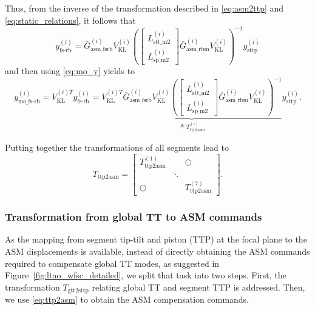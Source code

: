 \documentclass{gmto}
\begin{document}
Thus, from the inverse of the transformation described in \eqref{eq:asm2ttp} and \eqref{eq:static_relations}, it follows that
\begin{equation*}
y_\text{fs-rb}^{(i)}  = 
    \bar{G}_\text{asm\_fsrb}^{(i)}
    V_\text{KL}^{(i)}
    \left(
    \begin{bmatrix}
        L_\text{stt\_m2}^{(i)} \\ L_\text{sp\_m2}^{(i)}
    \end{bmatrix}
    \bar{G}_\text{asm\_rbm}^{(i)}
    V_\text{KL}^{(i)}
    \right)^{-1} y_\text{sttp}^{(i)}
\end{equation*}
and then using \eqref{eq:mo_y} yields to
\begin{equation*}
y_\text{mo\_fs-rb}^{(i)} = V_\text{KL}^{(i)T} 
y_\text{fs-rb}^{(i)}  = 
    \underbrace{
    V_\text{KL}^{(i)T}
    \bar{G}_\text{asm\_fsrb}^{(i)}
    V_\text{KL}^{(i)}
    \left(
    \begin{bmatrix}
        L_\text{stt\_m2}^{(i)} \\ L_\text{sp\_m2}^{(i)}
    \end{bmatrix}
    \bar{G}_\text{asm\_rbm}^{(i)}
    V_\text{KL}^{(i)}
    \right)^{-1}}_{\triangleq T_\text{ttp2asm}^{(i)}}
    y_\text{sttp}^{(i)}.
\end{equation*}

Putting together the transformations of all segments lead to
\begin{equation} \label{eq:ttp2asm}
    T_\text{ttp2asm} = \begin{bmatrix}
    T_\text{ttp2asm}^{(1)} & & \bigcirc  \\
    & \ddots & \\
    \bigcirc  & & T_\text{ttp2asm}^{(7)}
\end{bmatrix}.
\end{equation}

\subsubsection*{Transformation from global TT to ASM commands}

As the mapping from segment tip-tilt and piston (TTP) at the focal plane to the ASM displacements is available, instead of directly obtaining the ASM commands required to compensate global TT modes, as suggested in Figure~\ref{fig:ltao_wfsc_detailed}, we split that task into two steps. First, the transformation $T_\text{gtt2sttp}$ relating global TT and segment TTP is addressed. Then, we use \eqref{eq:ttp2asm} to obtain the ASM compensation commands.
\end{document}
